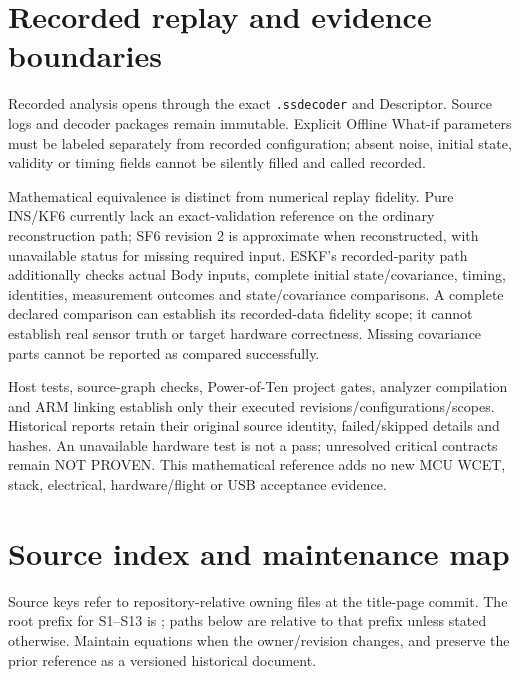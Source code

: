 \section{Recorded replay and evidence boundaries}
Recorded analysis opens through the exact \texttt{.ssdecoder} and Descriptor. Source logs and decoder packages remain immutable. Explicit Offline What-if parameters must be labeled separately from recorded configuration; absent noise, initial state, validity or timing fields cannot be silently filled and called recorded.

Mathematical equivalence is distinct from numerical replay fidelity. Pure INS/KF6 currently lack an exact-validation reference on the ordinary reconstruction path; SF6 revision 2 is approximate when reconstructed, with unavailable status for missing required input. ESKF's recorded-parity path additionally checks actual Body inputs, complete initial state/covariance, timing, identities, measurement outcomes and state/covariance comparisons. A complete declared comparison can establish its recorded-data fidelity scope; it cannot establish real sensor truth or target hardware correctness. Missing covariance parts cannot be reported as compared successfully.

Host tests, source-graph checks, Power-of-Ten project gates, analyzer compilation and ARM linking establish only their executed revisions/configurations/scopes. Historical reports retain their original source identity, failed/skipped details and hashes. An unavailable hardware test is not a pass; unresolved critical contracts remain NOT PROVEN. This mathematical reference adds no new MCU WCET, stack, electrical, hardware/flight or USB acceptance evidence.

\section{Source index and maintenance map}
\label{sec:sources}
Source keys refer to repository-relative owning files at the title-page commit. The root prefix for S1--S13 is ; paths below are relative to that prefix unless stated otherwise. Maintain equations when the owner/revision changes, and preserve the prior reference as a versioned historical document.

